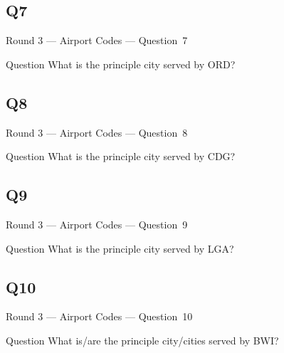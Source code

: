 \documentclass[11pt]{beamer}
\begin{document}
\subsection*{Q7}
\begin{frame}[t]{Round 3 --- Airport Codes --- \mbox{Question 7}}
\begin{block}{Question}
What is the principle city served by ORD\@?
\end{block}
\end{frame}
\subsection*{Q8}
\begin{frame}[t]{Round 3 --- Airport Codes --- \mbox{Question 8}}
\begin{block}{Question}
What is the principle city served by CDG\@?
\end{block}
\end{frame}
\subsection*{Q9}
\begin{frame}[t]{Round 3 --- Airport Codes --- \mbox{Question 9}}
\begin{block}{Question}
What is the principle city served by LGA\@?
\end{block}
\end{frame}
\subsection*{Q10}
\begin{frame}[t]{Round 3 --- Airport Codes --- \mbox{Question 10}}
\begin{block}{Question}
What is/are the principle city/cities served by BWI\@?
\end{block}
\end{frame}
\end{document}
